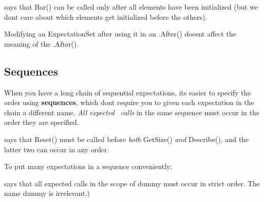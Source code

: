 \begin{DoxyCode}{0}
\DoxyCodeLine{\}}
\end{DoxyCode}
 says that {\ttfamily Bar()} can be called only after all elements have been initialized (but we don\textquotesingle{}t care about which elements get initialized before the others).

Modifying an {\ttfamily Expectation\+Set} after using it in an {\ttfamily .After()} doesn\textquotesingle{}t affect the meaning of the {\ttfamily .After()}.

\subsection*{Sequences}

When you have a long chain of sequential expectations, it\textquotesingle{}s easier to specify the order using {\bfseries sequences}, which don\textquotesingle{}t require you to given each expectation in the chain a different name. {\itshape All expected~\newline
 calls} in the same sequence must occur in the order they are specified.


\begin{DoxyCode}{0}
\end{DoxyCode}
 says that {\ttfamily Reset()} must be called before {\itshape both} {\ttfamily Get\+Size()} {\itshape and} {\ttfamily Describe()}, and the latter two can occur in any order.

To put many expectations in a sequence conveniently\+: 
\begin{DoxyCode}{0}
\DoxyCodeLine{\{}
\DoxyCodeLine{}
\DoxyCodeLine{\}}
\end{DoxyCode}
 says that all expected calls in the scope of {\ttfamily dummy} must occur in strict order. The name {\ttfamily dummy} is irrelevant.)

